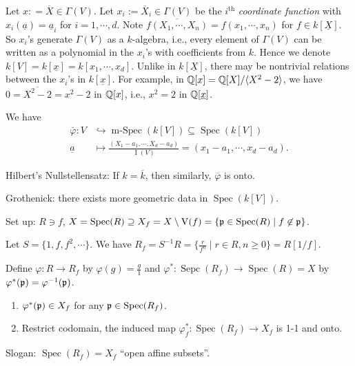 \begin{construction*}
    Let $x: = \overbar{X} \in \Gamma(V)$. Let $x_i := \overbar X_i \in \Gamma(V)$ be the $i^{\text{th}}$ \emph{coordinate function} with $x_i(\underline a) = \underline a_i$ for $i = 1,\cdots,d$. Note $\overbar{f(X_1,\cdots,X_n)} = f(x_1,\cdots,x_n)$ for $f \in k[\underline X]$. So $x_i$'s generate $\Gamma(V)$ as a $k$-algebra, i.e., every element of $\Gamma(V)$ can be written as a polynomial in the $x_i$'s with coefficients from $k$. Hence we denote $k[V]=k[\underline x] = k[x_1,\cdots,x_d]$. Unlike in $k[\underline X]$, there may be nontrivial relations between the $x_i$'s in $k[\underline x]$. For example, in $\mathbb{Q}[x] = \mathbb{Q}[X]/\langle X^2-2 \rangle$, we have $0 = \overbar {X^2-2} = x^{2} - 2$ in $\mathbb{Q}[x]$, i.e., $x^{2} = 2$ in $\mathbb{Q}[\underline x]$. \par 
    We have 
    \begin{align*}
        \overbar \varphi: V &\hookrightarrow \operatorname{m-Spec}(k[V]) \subseteq \operatorname{Spec}(k[V]) \\
        \underline a &\mapsto \frac{(X_1-a_1,\cdots,X_d-a_d)}{\operatorname{I}(V)} = (x_1 - a_1,\cdots, x_d - a_d). 
    \end{align*}
    \par Hilbert's Nullstellensatz: If $k = \overbar k$, then similarly, $\overbar \varphi$ is onto. \par 
    Grothenick: there exists more geometric data in $\operatorname{Spec}(k[V])$. 
\end{construction*}

\noindent Set up: $R \ni f$, $X = \operatorname{Spec}(R) \supseteq X_f = X \setminus \operatorname{V}(f) = \{\mathfrak{p} \in \operatorname{Spec}(R) \mid f \not \in \mathfrak{p}\}$.

\begin{recall*}
    Let $S = \{1,f,f^2,\cdots\}$. We have $R_f = S^{-1}R = \{\frac{r}{f^n} \mid r \in R, n \geq 0\} = R[1/f]$.
\end{recall*}

\begin{proposition}
    Define $\varphi: R \to R_f$ by $\varphi(g) = \frac{g}{1}$ and $\varphi^*: \operatorname{Sepc}(R_f) \to \operatorname{Spec}(R) = X$ by $\varphi^*(\mathfrak{p}) = \varphi^{-1}(\mathfrak{p})$.
    \begin{enumerate}
        \item $\varphi^*(\mathfrak{p}) \in X_f$ for any $\mathfrak{p} \in \operatorname{Spec}(R_f)$. 
        \item Restrict codomain, the induced map $\varphi_f^*: \operatorname{Spec}(R_f) \to X_f$ is 1-1 and onto.
    \end{enumerate}
    Slogan: $\operatorname{Spec}(R_f) = X_f$ ``open affine subsets''.
\end{proposition}

